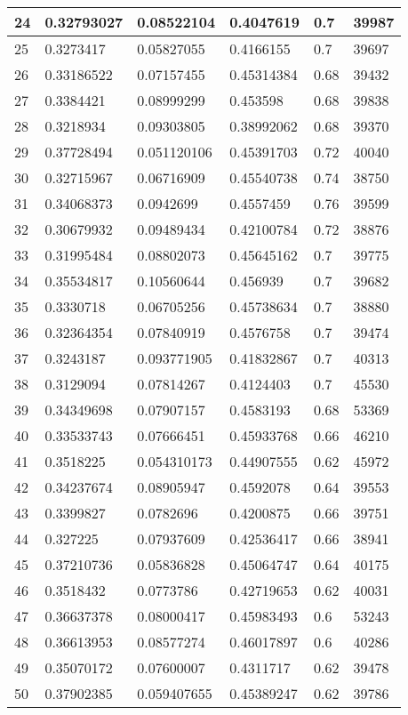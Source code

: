 \begin{longtable}{|l|l|l|l|l|l|}
24 & 0.32793027 & 0.08522104 & 0.4047619 & 0.7 & 39987 \\ \hline 
25 & 0.3273417 & 0.05827055 & 0.4166155 & 0.7 & 39697 \\ \hline 
26 & 0.33186522 & 0.07157455 & 0.45314384 & 0.68 & 39432 \\ \hline 
27 & 0.3384421 & 0.08999299 & 0.453598 & 0.68 & 39838 \\ \hline 
28 & 0.3218934 & 0.09303805 & 0.38992062 & 0.68 & 39370 \\ \hline 
29 & 0.37728494 & 0.051120106 & 0.45391703 & 0.72 & 40040 \\ \hline 
30 & 0.32715967 & 0.06716909 & 0.45540738 & 0.74 & 38750 \\ \hline 
31 & 0.34068373 & 0.0942699 & 0.4557459 & 0.76 & 39599 \\ \hline 
32 & 0.30679932 & 0.09489434 & 0.42100784 & 0.72 & 38876 \\ \hline 
33 & 0.31995484 & 0.08802073 & 0.45645162 & 0.7 & 39775 \\ \hline 
34 & 0.35534817 & 0.10560644 & 0.456939 & 0.7 & 39682 \\ \hline 
35 & 0.3330718 & 0.06705256 & 0.45738634 & 0.7 & 38880 \\ \hline 
36 & 0.32364354 & 0.07840919 & 0.4576758 & 0.7 & 39474 \\ \hline 
37 & 0.3243187 & 0.093771905 & 0.41832867 & 0.7 & 40313 \\ \hline 
38 & 0.3129094 & 0.07814267 & 0.4124403 & 0.7 & 45530 \\ \hline 
39 & 0.34349698 & 0.07907157 & 0.4583193 & 0.68 & 53369 \\ \hline 
40 & 0.33533743 & 0.07666451 & 0.45933768 & 0.66 & 46210 \\ \hline 
41 & 0.3518225 & 0.054310173 & 0.44907555 & 0.62 & 45972 \\ \hline 
42 & 0.34237674 & 0.08905947 & 0.4592078 & 0.64 & 39553 \\ \hline 
43 & 0.3399827 & 0.0782696 & 0.4200875 & 0.66 & 39751 \\ \hline 
44 & 0.327225 & 0.07937609 & 0.42536417 & 0.66 & 38941 \\ \hline 
45 & 0.37210736 & 0.05836828 & 0.45064747 & 0.64 & 40175 \\ \hline 
46 & 0.3518432 & 0.0773786 & 0.42719653 & 0.62 & 40031 \\ \hline 
47 & 0.36637378 & 0.08000417 & 0.45983493 & 0.6 & 53243 \\ \hline 
48 & 0.36613953 & 0.08577274 & 0.46017897 & 0.6 & 40286 \\ \hline 
49 & 0.35070172 & 0.07600007 & 0.4311717 & 0.62 & 39478 \\ \hline 
50 & 0.37902385 & 0.059407655 & 0.45389247 & 0.62 & 39786 \\ \hline 
\end{longtable}